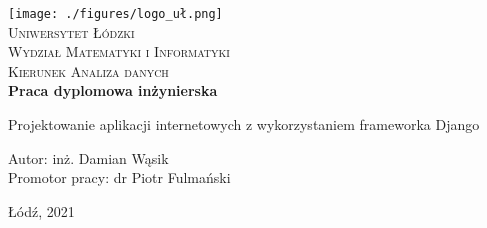 
\newpage
\thispagestyle{empty}





\begin{onehalfspacing}
\begin{center}

\centering
\texttt{[image: ./figures/logo\_uł.png]} \\[.8cm]


{\fontsize{17}{17}\selectfont
\textsc{Uniwersytet Łódzki \\[.3cm]
Wydział Matematyki i Informatyki  \\[.3cm]
Kierunek Analiza danych  \\[2.5cm]}
\textbf{Praca dyplomowa inżynierska \\[1.7cm]}}



\large 
{Projektowanie aplikacji internetowych z wykorzystaniem frameworka Django} \\[2.3cm]


\large
\begin{flushleft}
Autor: inż. Damian Wąsik  \\
Promotor pracy:  dr Piotr Fulmański \\
\end{flushleft}

\vspace{3cm}
Łódź, 2021
\end{center}
\end{onehalfspacing}






\setcounter{page}{0} \pagestyle{plain}


\tableofcontents




\pagestyle{fancy}